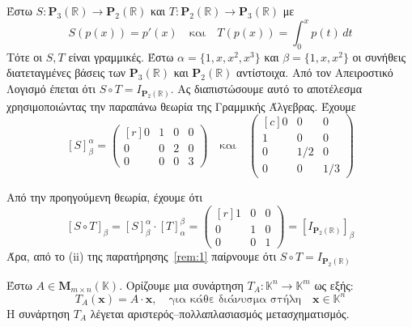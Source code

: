 \begin{example}
  Έστω $ S \colon \textbf{P}_{3}(\mathbb{R}) \to \textbf{P}_{2}(\mathbb{R}) $ 
  και $ T \colon \textbf{P}_{2}(\mathbb{R}) \to \textbf{P}_{3}(\mathbb{R}) $ 
  με 
  \[
    S(p(x)) = p'(x) \quad \text{και} \quad T(p(x)) = \int_{0}^{x} p(t) \,{dt} 
  \] 
  Τότε οι $ S,T $ είναι γραμμικές. Έστω $ \alpha = \{ 1,x,x^{2},x^{3} \} $ και 
  $ \beta = \{ 1,x,x^{2} \} $ οι συνήθεις διατεταγμένες βάσεις των $
  \textbf{P}_{3}(\mathbb{R}) $ και $ \textbf{P}_{2}(\mathbb{R}) $ αντίστοιχα.
  Από τον Απειροστικό Λογισμό έπεται ότι $ S \circ T = I_{\textbf{P}_{2}(\mathbb{R})}$. 
  Ας διαπιστώσουμε αυτό το αποτέλεσμα χρησιμοποιώντας την παραπάνω θεωρία της Γραμμικής
  Άλγεβρας. Έχουμε
  \[
    [S]_{\beta}^{\alpha} = 
    \begin{pmatrix*}[r]
      0 & 1 & 0 & 0 \\
      0 & 0 & 2 & 0 \\
      0 & 0 & 0 & 3
    \end{pmatrix*} \quad \text{και} \quad 
    \begin{pmatrix*}[c]
      0 & 0 & 0 \\
      1 & 0 & 0 \\
      0 & 1/2 & 0 \\
      0 & 0 & 1/3
    \end{pmatrix*}
  \] 
\end{example}
Από την προηγούμενη θεωρία, έχουμε ότι 
\[
  [S \circ T]_{\beta} = [S]_{\beta}^{\alpha} \cdot [T]_{\alpha}^{\beta} = 
  \begin{pmatrix*}[r]
    1 & 0 & 0 \\
    0 & 1 & 0 \\
    0 & 0 & 1
  \end{pmatrix*} = [I_{\textbf{P}_{2}(\mathbb{R})}]_{\beta}
\]
Άρα, από το (ii) της παρατήρησης~\ref{rem:1} παίρνουμε ότι 
$
S \circ T = I_{\textbf{P}_{2}(\mathbb{R})} 
$

\begin{dfn}
  Έστω $ A \in \textbf{M}_{m \times n}(\mathbb{K})  $. Ορίζουμε μια συνάρτηση 
  $ T_{A} \colon \mathbb{K}^{n} \to \mathbb{K}^{m} $ ως εξής:
  \[
    T_{A}(\mathbf{x}) = A \cdot \mathbf{x}, \quad \text{για κάθε διάνυσμα στήλη} 
    \quad  \mathbf{x} \in \mathbb{K}^{n}  
  \] 
  Η συνάρτηση $ T_{A} $ λέγεται αριστερός--πολλαπλασιασμός μετασχηματισμός.
\end{dfn}

